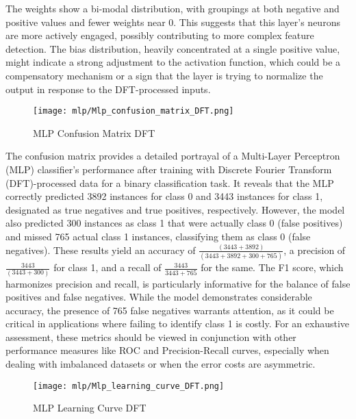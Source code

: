 The weights show a bi-modal distribution, with groupings at both negative and positive values and fewer weights near 0. This suggests that this layer's neurons are more actively engaged, possibly contributing to more complex feature detection. The bias distribution, heavily concentrated at a single positive value, might indicate a strong adjustment to the activation function, which could be a compensatory mechanism or a sign that the layer is trying to normalize the output in response to the DFT-processed inputs.

\begin{figure}[H] 
  \centering
  \texttt{[image: mlp/Mlp\_confusion\_matrix\_DFT.png]}
  \caption{MLP Confusion Matrix DFT}\label{fig:Mlp_confusion_matrix_DFT}
\end{figure}

The confusion matrix provides a detailed portrayal of a Multi-Layer Perceptron (MLP) classifier's performance after training with Discrete Fourier Transform (DFT)-processed data for a binary classification task. It reveals that the MLP correctly predicted 3892 instances for class 0 and 3443 instances for class 1, designated as true negatives and true positives, respectively. However, the model also predicted 300 instances as class 1 that were actually class 0 (false positives) and missed 765 actual class 1 instances, classifying them as class 0 (false negatives). These results yield an accuracy of $\frac{(3443+3892)}{(3443+3892+300+765)}$, a precision of $\frac{3443}{(3443+300)}$ for class 1, and a recall of $\frac{3443}{3443+765}$ for the same. The F1 score, which harmonizes precision and recall, is particularly informative for the balance of false positives and false negatives. While the model demonstrates considerable accuracy, the presence of 765 false negatives warrants attention, as it could be critical in applications where failing to identify class 1 is costly. For an exhaustive assessment, these metrics should be viewed in conjunction with other performance measures like ROC and Precision-Recall curves, especially when dealing with imbalanced datasets or when the error costs are asymmetric.

\begin{figure}[H] 
  \centering
  \texttt{[image: mlp/Mlp\_learning\_curve\_DFT.png]}
  \caption{MLP Learning Curve DFT}\label{fig:Mlp_learning_curve_DFT}
\end{figure}

